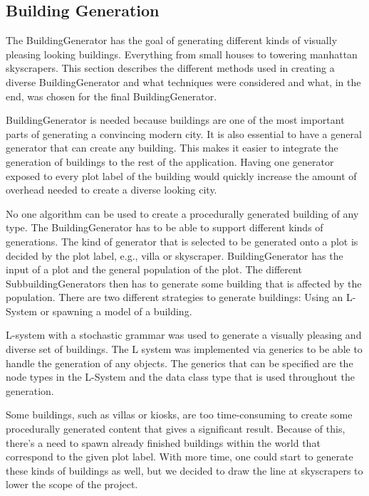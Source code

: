 \subsection{Building Generation}
The BuildingGenerator has the goal of generating different kinds of visually pleasing looking buildings. 
Everything from small houses to towering manhattan skyscrapers. 
This section describes the different methods used in creating a diverse BuildingGenerator and what techniques were considered and what, in the end, was chosen for the final BuildingGenerator. 

BuildingGenerator is needed because buildings are one of the most important parts of generating a convincing modern city. 
It is also essential to have a general generator that can create any building. 
This makes it easier to integrate the generation of buildings to the rest of the application. 
Having one generator exposed to every plot label of the building would quickly increase the amount of overhead needed to create a diverse looking city. 

No one algorithm can be used to create a procedurally generated building of any type. 
The BuildingGenerator has to be able to support different kinds of generations. 
The kind of generator that is selected to be generated onto a plot is decided by the plot label, e.g., villa or skyscraper. 
BuildingGenerator has the input of a plot and the general population of the plot. 
The different SubbuildingGenerators then has to generate some building that is affected by the population. 
There are two different strategies to generate buildings: Using an L-System or spawning a model of a building. 

L-system with a stochastic grammar was used to generate a visually pleasing and diverse set of buildings. 
The L system was implemented via generics to be able to handle the generation of any objects.
The generics that can be specified are the node types in the L-System and the data class type that is used throughout the generation. 

Some buildings, such as villas or kiosks, are too time-consuming to create some procedurally generated content that gives a significant result. 
Because of this, there’s a need to spawn already finished buildings within the world that correspond to the given plot label. 
With more time, one could start to generate these kinds of buildings as well, but we decided to draw the line at skyscrapers to lower the scope of the project.
